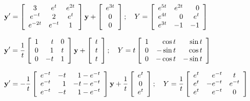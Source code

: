 \begin{exerciselist}
  \item\label{exer:10.7.18} $\displaystyle{{\bf y}'= \left[\begin{array}{ccc}3&e^{t}&e^{2t}\\e^{-t}&2&e^{t}\\e^{-2t}&e^{-t}&1\end{array}\right]{\bf y} +\left[\begin{array}{c}e^{3t}\\0\\0\end{array}\right];\quad Y=\left[\begin{array}{crr}e^{5t}&e^{2t}&0\\e^{4t}&0&e^{t}\\e^{3t}&-1&-1\end{array}\right]}$

  \item\label{exer:10.7.19} $\displaystyle{{\bf y}'=\frac{1}{t}\left[\begin{array}{crc}1&t&0\\0&1&t\\0&-t&1\end{array}\right]{\bf y} +\left[\begin{array}{c}t\\t\\t\end{array}\right];\quad Y=t\left[\begin{array}{crr}1&\cos t&\sin t\\0&-\sin t&\cos t\\0&-\cos t&-\sin t\end{array}\right]}$

  \item\label{exer:10.7.20} $\displaystyle{{\bf y}'=-\frac{1}{t}\left[\begin{array}{crr}e^{-t}&-t&1-e^{-t}\\e^{-t}&1&-t-e^{-t}\\e^{-t}&-t &1-e^{-t}\end{array}\right]{\bf y} +\frac{1}{t}\left[\begin{array}{c}e^{t}\\0\\e^{t}\end{array}\right];\quad Y=\frac{1}{t}\left[\begin{array}{crc}e^{t}&e^{-t}&t\\e^{t}&-e^{-t}&e^{-t}\\e^{t}&e^{-t}&0\end{array}\right]}$


\end{exerciselist}

